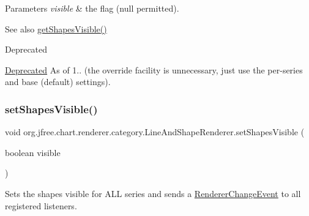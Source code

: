 \begin{DoxyParams}{Parameters}
{\em visible} & the flag ({\ttfamily null} permitted).\\
\hline
\end{DoxyParams}
\begin{DoxySeeAlso}{See also}
\mbox{\hyperlink{classorg_1_1jfree_1_1chart_1_1renderer_1_1category_1_1_line_and_shape_renderer_a1b2c53ae8be56288c260b6da6fec348b}{get\+Shapes\+Visible()}}
\end{DoxySeeAlso}
\begin{DoxyRefDesc}{Deprecated}
\item[\mbox{\hyperlink{deprecated__deprecated000190}{Deprecated}}]As of 1.. (the override facility is unnecessary, just use the per-\/series and base (default) settings). \end{DoxyRefDesc}
\mbox{\label{classorg_1_1jfree_1_1chart_1_1renderer_1_1category_1_1_line_and_shape_renderer_a0554bd98df3546cff06ae18da5204e9a}} 
\subsubsection{\texorpdfstring{set\+Shapes\+Visible()}{setShapesVisible()}\hspace{0.1cm}{\footnotesize\ttfamily [2/2]}}
{\footnotesize\ttfamily void org.\+jfree.\+chart.\+renderer.\+category.\+Line\+And\+Shape\+Renderer.\+set\+Shapes\+Visible (\begin{DoxyParamCaption}\item[{boolean}]{visible }\end{DoxyParamCaption})}

Sets the \textquotesingle{}shapes visible\textquotesingle{} for A\+LL series and sends a \mbox{\hyperlink{}{Renderer\+Change\+Event}} to all registered listeners.


